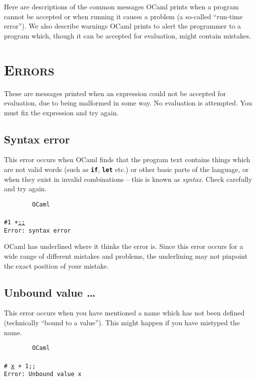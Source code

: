 \documentclass[]{book}
\newcommand{\plet}{\textbf{let}\xspace}
\newcommand{\pif}{\textbf{if}\xspace}
\newcommand{\smspace}{\vspace{4mm}}
\begin{document}
Here are descriptions of the common messages OCaml prints when a program cannot be accepted or when running it causes a problem (a so-called ``run-time error''). We also describe warnings OCaml prints to alert the programmer to a program which, though it can be accepted for evaluation, might contain mistakes.

\section*{\scshape Errors}

These are messages printed when an expression could not be accepted for evaluation, due to being malformed in some way. No evaluation is attempted. You must fix the expression and try again.

\subsection*{Syntax error}

This error occurs when OCaml finds that the program text contains things which are not valid words (such as \texttt{\pif}, \texttt{\plet} etc.) or other basic parts of the language, or when they exist in invalid combinations -- this is known as \textit{syntax}. Check carefully and try again.

\smspace
\noindent\verb!        OCaml!\\
\noindent\\
\noindent\texttt{\#1 +\underline{;;}}\\
\noindent\verb!Error: syntax error!
\smspace

\noindent OCaml has underlined where it thinks the error is. Since this error occurs for a wide range of different mistakes and problems, the underlining may not pinpoint the exact position of your mistake.

\subsection*{Unbound value \ldots}

This error occurs when you have mentioned a name which has not been defined (technically ``bound to a value''). This might happen if you have mistyped the name.

\smspace
\noindent\verb!        OCaml!\\
\noindent\\
\texttt{\# \underline{x} + 1;;}\\
\texttt{Error:\ Unbound value x}
\smspace
\end{document}
